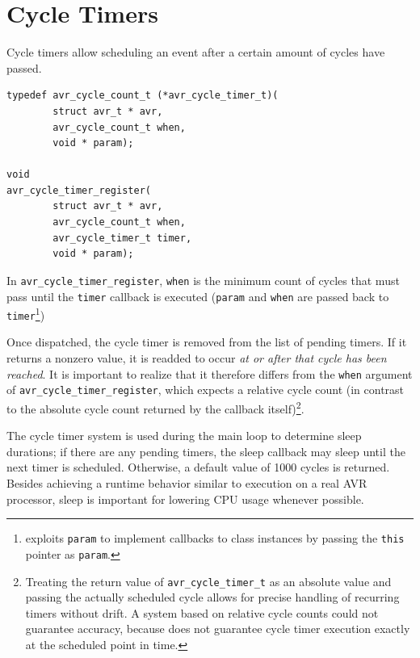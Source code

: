 \section{Cycle Timers} \label{section:cycle_timers}

Cycle timers allow scheduling an event after a certain amount of cycles have
passed.

\begin{lstlisting}
typedef avr_cycle_count_t (*avr_cycle_timer_t)(
        struct avr_t * avr,
        avr_cycle_count_t when,
        void * param);

void
avr_cycle_timer_register(
        struct avr_t * avr,
        avr_cycle_count_t when,
        avr_cycle_timer_t timer,
        void * param);
\end{lstlisting}

In \lstinline|avr_cycle_timer_register|,
\lstinline|when| is the minimum count of cycles that must pass until the
\lstinline|timer| callback is executed (\lstinline|param| and \lstinline|when|
are passed back to \lstinline|timer|\footnote{
\qsimavr exploits \lstinline|param| to implement
callbacks to class instances by passing the \lstinline|this| pointer as
\lstinline|param|.})

Once dispatched, the cycle timer is removed from the list of pending timers. If
it returns a nonzero value, it is readded to occur \emph{at or after that cycle has
been reached}. It is important to realize that it therefore differs from the
\lstinline|when| argument of \lstinline|avr_cycle_timer_register|, which expects
a relative cycle count (in contrast to the absolute cycle count returned by the
callback itself)\footnote{
%
Treating the return value of \lstinline|avr_cycle_timer_t| as an absolute value
and passing the actually scheduled cycle allows for precise handling of recurring
timers without drift. A system based on relative cycle counts could not guarantee
accuracy, because \simavr does not guarantee cycle timer execution exactly at the
scheduled point in time.
}.

The cycle timer system is used during the main loop to determine sleep durations;
if there are any pending timers, the sleep callback may sleep until the next timer
is scheduled. Otherwise, a default value of 1000 cycles is returned.
Besides achieving a runtime behavior similar to execution on a real \ac{AVR}
processor, sleep is important for lowering \simavr \ac{CPU} usage whenever possible.

